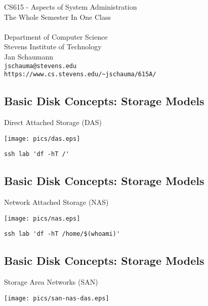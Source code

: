 \documentclass[xga]{xdvislides}
\begin{document}
\setfontphv

\lhead{\slidetitle}				%
\cfoot{\relax}					%
\rfoot{\Gray{\today}}

\vspace*{\fill}
\begin{center}
	\Hugesize
		CS615 - Aspects of System Administration\\ [1em]
		The Whole Semester In One Class\\ [1em]
	\hspace*{5mm}\blueline\\ [1em]
	\Normalsize
		Department of Computer Science\\
		Stevens Institute of Technology\\
		Jan Schaumann\\
		\verb+jschauma@stevens.edu+ \\
		\verb+https://www.cs.stevens.edu/~jschauma/615A/+
\end{center}
\vspace*{\fill}

\subsection{Basic Disk Concepts: Storage Models}
Direct Attached Storage (DAS)
\vfill
\begin{center}
	\texttt{[image: pics/das.eps]} \\
\end{center}
\verb+ssh lab 'df -hT /'+
\vfill

\subsection{Basic Disk Concepts: Storage Models}
Network Attached Storage (NAS)
\vfill
\begin{center}
	\texttt{[image: pics/nas.eps]} \\
\end{center}
\verb+ssh lab 'df -hT /home/$(whoami)'+
\vfill

\subsection{Basic Disk Concepts: Storage Models}
Storage Area Networks (SAN)
\vfill
\begin{center}
	\texttt{[image: pics/san-nas-das.eps]} \\
\end{center}
\vfill
\end{document}
